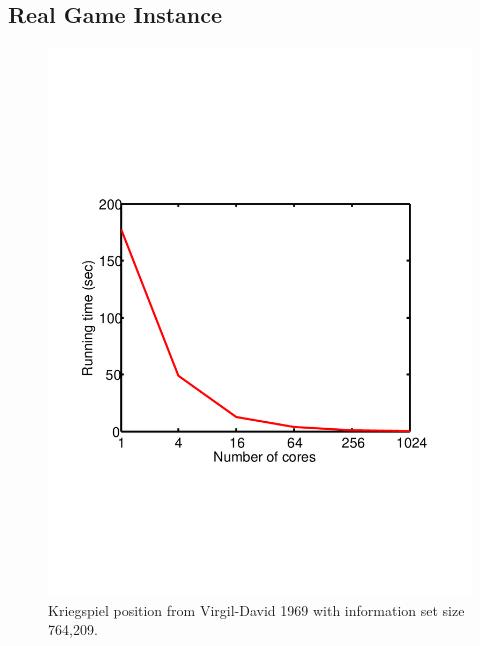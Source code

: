 \documentclass[times, 10pt,twocolumn]{article}
\begin{document}
\subsection{Real Game Instance}
\begin{figure}[ht]
 \centering \includegraphics[viewport= 280 200 300 550, scale=0.35]{images/KriegspielProblem4.pdf} %

\caption{Kriegspiel position from Virgil-David 1969 with information set size
764,209.}

\label{prob4} 
\vspace{-0.2in}
\end{figure}
\end{document}

